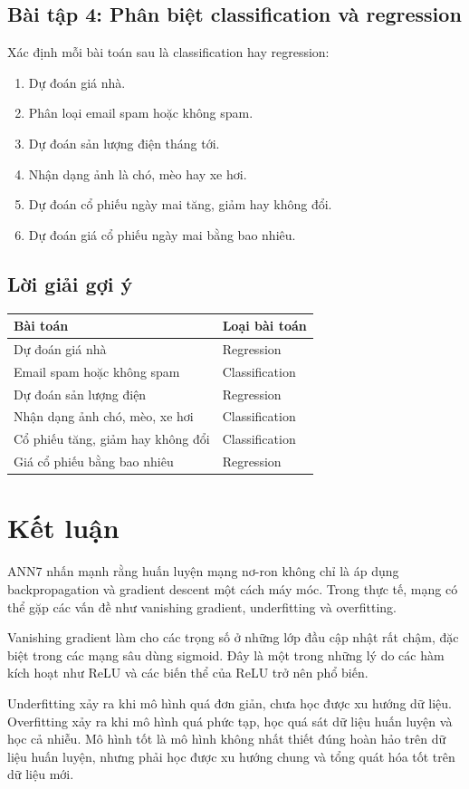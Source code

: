 \documentclass[12pt,a4paper]{report}
\begin{document}
\section*{Bài tập 4: Phân biệt classification và regression}

Xác định mỗi bài toán sau là classification hay regression:

\begin{enumerate}
    \item Dự đoán giá nhà.
    \item Phân loại email spam hoặc không spam.
    \item Dự đoán sản lượng điện tháng tới.
    \item Nhận dạng ảnh là chó, mèo hay xe hơi.
    \item Dự đoán cổ phiếu ngày mai tăng, giảm hay không đổi.
    \item Dự đoán giá cổ phiếu ngày mai bằng bao nhiêu.
\end{enumerate}

\section*{Lời giải gợi ý}

\begin{center}
\begin{tabular}{ll}
\toprule
Bài toán & Loại bài toán \\
\midrule
Dự đoán giá nhà & Regression \\
Email spam hoặc không spam & Classification \\
Dự đoán sản lượng điện & Regression \\
Nhận dạng ảnh chó, mèo, xe hơi & Classification \\
Cổ phiếu tăng, giảm hay không đổi & Classification \\
Giá cổ phiếu bằng bao nhiêu & Regression \\
\bottomrule
\end{tabular}
\end{center}

\chapter*{Kết luận}

ANN7 nhấn mạnh rằng huấn luyện mạng nơ-ron không chỉ là áp dụng backpropagation và gradient descent một cách máy móc. Trong thực tế, mạng có thể gặp các vấn đề như vanishing gradient, underfitting và overfitting.

Vanishing gradient làm cho các trọng số ở những lớp đầu cập nhật rất chậm, đặc biệt trong các mạng sâu dùng sigmoid. Đây là một trong những lý do các hàm kích hoạt như ReLU và các biến thể của ReLU trở nên phổ biến.

Underfitting xảy ra khi mô hình quá đơn giản, chưa học được xu hướng dữ liệu. Overfitting xảy ra khi mô hình quá phức tạp, học quá sát dữ liệu huấn luyện và học cả nhiễu. Mô hình tốt là mô hình không nhất thiết đúng hoàn hảo trên dữ liệu huấn luyện, nhưng phải học được xu hướng chung và tổng quát hóa tốt trên dữ liệu mới.
\end{document}
